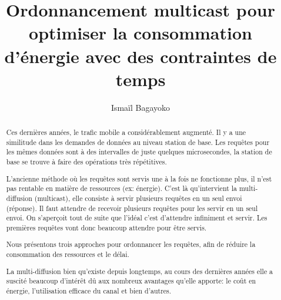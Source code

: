 \documentclass[runningheads]{llncs}
\begin{document}
%
\title{Ordonnancement multicast pour optimiser la consommation d'énergie avec des contraintes de temps}
%

\author{Isma\"il Bagayoko}
%

%
\maketitle              %
%
\begin{abstract}
Ces dernières années, le trafic mobile a considérablement augmenté. 
Il y a une similitude dans les demandes de données au niveau station 
de base. Les requêtes pour les mêmes données sont à des intervalles 
de juste quelques microsecondes, la station de base se trouve à faire des 
opérations très répétitives. 

L'ancienne méthode où les requêtes sont servis une à la fois ne 
fonctionne plus, il n'est pas rentable en matière de ressources 
(ex: énergie). C'est là qu'intervient la multi-diffusion (multicast), 
elle consiste à servir plusieurs requêtes en un seul envoi (réponse).
Il faut attendre de recevoir  plusieurs requêtes pour les servir en 
un seul envoi. On s'aperçoit tout de suite que l'idéal c'est d'attendre 
infiniment et servir. Les premières requêtes vont donc beaucoup attendre pour 
être servis.

Nous présentons trois approches pour ordonnancer les requêtes, afin de 
réduire la consommation des ressources et le délai.


La multi-diffusion bien qu'existe depuis longtemps, au cours des 
dernières années elle a suscité beaucoup d'intérêt dû aux nombreux 
avantages qu'elle apporte: le coût en énergie, l'utilisation efficace 
du canal et bien d'autres.


\end{abstract}
%
%
%
\end{document}
